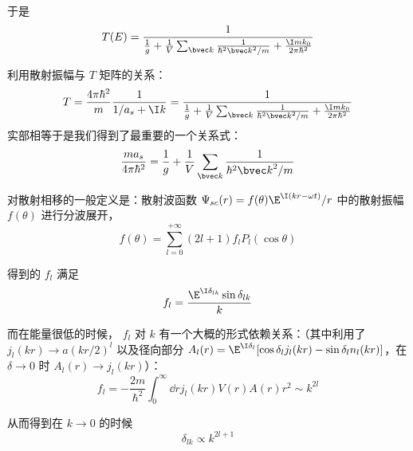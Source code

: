 于是
\begin{equation}
T(E) = \dfrac{1}{\frac{1}{g} + \frac{1}{V}\sum_{\bvec k}\frac{1}{\hbar^2{\bvec k}^2/m} + \frac{\I mk_0}{2\pi\hbar^2}}
\end{equation}

利用散射振幅与 $T$ 矩阵的关系：
\begin{equation}
T=\frac{4\pi\hbar^2}{m}\frac{1}{1/a_s + \I k} = \dfrac{1}{\frac{1}{g} + \frac{1}{V}\sum_{\bvec k}\frac{1}{\hbar^2{\bvec k}^2/m} + \frac{\I mk_0}{2\pi\hbar^2}}
\end{equation}
实部相等于是我们得到了最重要的一个关系式：
\begin{equation}\label{TwoAtF_eq38}
\frac{ma_s}{4\pi\hbar^2} = \frac{1}{g} + \frac{1}{V}\sum_{\bvec k}\frac{1}{\hbar^2{\bvec k}^2/m}
\end{equation}

对散射相移的一般定义是：散射波函数 $\Psi_{sc}(r) = f(\theta) \E^{\I (kr-\omega t)}/r$ 中的散射振幅 $f(\theta)$ 进行分波展开，
\begin{equation}
f(\theta) = \sum_{l=0}^{+\infty} (2l+1) f_l P_l(\cos\theta)
\end{equation}

得到的 $f_l$ 满足
\begin{equation}
f_l = \frac{\E^{\I\delta_{lk}}\sin\delta_{lk}}{k}
\end{equation}

而在能量很低的时候， $f_l$ 对 $k$ 有一个大概的形式依赖关系：（其中利用了 $j_l(kr)\to a(kr/2)^l$ 以及径向部分 $A_l(r) = \E^{\I\delta_l}[\cos\delta_l j_l(kr) -  \sin\delta_l n_l(kr)]$，在 $\delta\to0$ 时 $A_l(r)\to j_l(kr)$）：
\begin{equation}
f_l = -\frac{2m}{\hbar^2}\int_0^{\infty} \dd{r} j_l(kr)V(r)A(r)r^2 \sim k^{2l}
\end{equation}

从而得到在 $k\to0$ 的时候
\begin{equation}
\delta_{lk}\propto k^{2l+1}
\end{equation}
